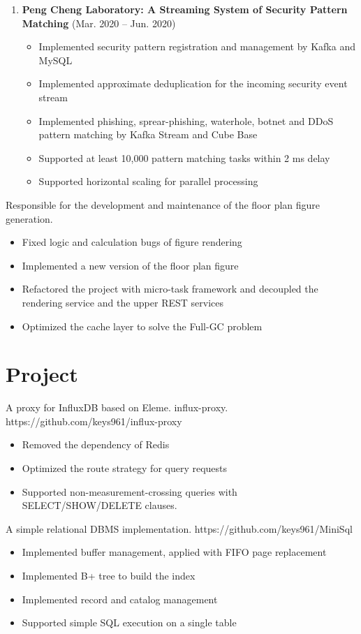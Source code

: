 \documentclass{resume}
\begin{document}
\begin{enumerate}
  \item \textbf{Peng Cheng Laboratory: A Streaming System of Security Pattern Matching} (Mar. 2020 -- Jun. 2020)
  \begin{itemize}
    \item Implemented security pattern registration and management by Kafka and MySQL
    \item Implemented approximate deduplication for the incoming security event stream
    \item Implemented phishing, sprear-phishing, waterhole, botnet and DDoS pattern matching by Kafka Stream and Cube Base
    \item Supported at least 10,000 pattern matching tasks within 2 ms delay
    \item Supported horizontal scaling for parallel processing
  \end{itemize}
\end{enumerate}

Responsible for the development and maintenance of the floor plan figure generation.
\begin{itemize}
  \item Fixed logic and calculation bugs of figure rendering
  \item Implemented a new version of the floor plan figure
  \item Refactored the project with micro-task framework and decoupled the rendering service and the upper REST services
  \item Optimized the cache layer to solve the Full-GC problem
\end{itemize}

\newpage

\section{Project}
A proxy for InfluxDB based on Eleme. influx-proxy. https://github.com/keys961/influx-proxy
\begin{itemize}
  \item Removed the dependency of Redis
  \item Optimized the route strategy for query requests
  \item Supported non-measurement-crossing queries with SELECT/SHOW/DELETE clauses.
\end{itemize}
A simple relational DBMS implementation. https://github.com/keys961/MiniSql
\begin{itemize}
  \item Implemented buffer management, applied with FIFO page replacement
  \item Implemented B+ tree to build the index
  \item Implemented record and catalog management
  \item Supported simple SQL execution on a single table
\end{itemize}
\end{document}
